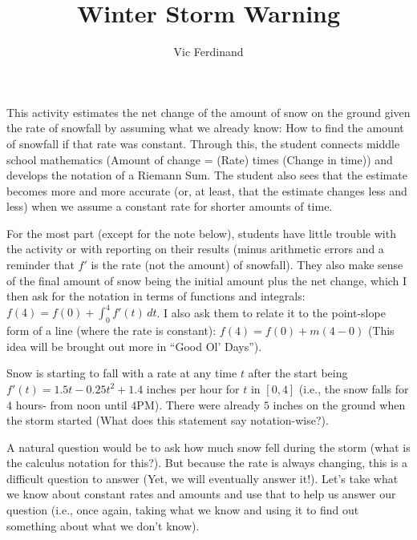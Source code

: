 \documentclass{ximera}
\author{Vic Ferdinand}
\title{Winter Storm Warning}
\begin{document}
\begin{abstract}
\end{abstract}
\maketitle

\begin{instructorNotes}
This activity estimates the net change of the amount of snow on the ground given the rate of snowfall by assuming what we already know:  How to find the amount of snowfall if that rate was constant.  Through this, the student connects middle school mathematics (Amount of change = (Rate) times (Change in time)) and develops the notation of a Riemann Sum.  The student also sees that the estimate becomes more and more accurate (or, at least, that the estimate changes less and less) when we assume a constant rate for shorter amounts of time.

For the most part (except for the note below), students have little trouble with the activity or with reporting on their results (minus arithmetic errors and a reminder that $f'$ is the rate (not the amount) of snowfall).  They also make sense of the final amount of snow being the initial amount plus the net change, which I then ask for the notation in terms of functions and integrals:   $f(4) = f(0) + \int_0^4 f'(t)\, dt$.  I also ask them to relate it to the point-slope form of a line (where the rate is constant):  $f(4) = f(0) + m (4-0)$  (This idea will be brought out more in ``Good Ol' Days'').



\end{instructorNotes}



    Snow is starting to fall with a rate at any time $t$ after the start being $f'(t) = 1.5t-0.25t^2+1.4$ inches per hour for $t$ in $[0,4]$ (i.e., the snow falls for $4$ hours- from noon until $4$PM).  There were already $5$ inches on the ground when the storm started (What does this statement say notation-wise?).
    
   A natural question would be to ask how much snow fell during the storm (what is the calculus notation for this?).  But because the rate is always changing, this is a difficult question to answer (Yet, we will eventually answer it!).  Let's take what we know about constant rates and amounts and use that to help us answer our question (i.e., once again, taking what we know and using it to find out something about what we don't know).
   
\end{document}
